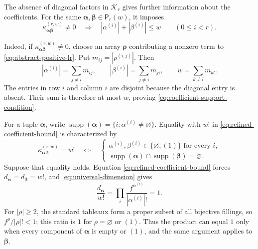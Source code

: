 \documentclass[12pt,reqno,a4paper]{amsart}
\numberwithin{equation}{section}
\numberwithin{figure}{section}
\theoremstyle{plain}
\theoremstyle{definition}
\begin{document}
The absence of diagonal factors in $\mathcal K_r$ gives further
information about the coefficients.  For the same
$\boldsymbol\alpha,\boldsymbol\beta\in\mathsf P_r(w)$, it imposes
\begin{equation}\label{eq:coefficient-support-condition}
 \kappa^{(r,w)}_{\boldsymbol\alpha\boldsymbol\beta}\neq0
 \quad\Longrightarrow\quad
 |\alpha^{(i)}|+|\beta^{(i)}|\leq w
 \qquad(0\leq i<r).
\end{equation}

Indeed, if $\kappa^{(r,w)}_{\boldsymbol\alpha\boldsymbol\beta}\neq0$,
choose an array $\boldsymbol\rho$ contributing a nonzero term to
\eqref{eq:abstract-positive-lr}.  Put
$m_{ij}=|\rho^{(i,j)}|$.  Then
\[
 |\alpha^{(i)}|=\sum_{j\neq i}m_{ij},
 \qquad
 |\beta^{(i)}|=\sum_{j\neq i}m_{ji},
 \qquad
 w=\sum_{k\neq l}m_{kl}.
\]
The entries in row $i$ and column $i$ are disjoint because the
diagonal entry is absent.  Their sum is therefore at most $w$, proving
\eqref{eq:coefficient-support-condition}.

For a tuple $\boldsymbol\alpha$, write
$\operatorname{supp}(\boldsymbol\alpha)=\{i:\alpha^{(i)}\ne\varnothing\}$.
Equality with $w!$ in \eqref{eq:refined-coefficient-bound} is
characterized by
\begin{equation}\label{eq:factorial-equality-case}
 \kappa^{(r,w)}_{\boldsymbol\alpha\boldsymbol\beta}=w!
 \quad\Longleftrightarrow\quad
 \left\{
 \begin{array}{l}
  \alpha^{(i)},\beta^{(i)}\in\{\varnothing,(1)\}
  \text{ for every }i,\\
  \operatorname{supp}(\boldsymbol\alpha)\cap
  \operatorname{supp}(\boldsymbol\beta)=\varnothing.
 \end{array}
 \right.
\end{equation}
Suppose that equality holds.  Equation
\eqref{eq:refined-coefficient-bound} forces
$d_{\boldsymbol\alpha}=d_{\boldsymbol\beta}=w!$, and
\eqref{eq:universal-dimension} gives
\[
 \frac{d_{\boldsymbol\alpha}}{w!}
 =\prod_i\frac{f^{\alpha^{(i)}}}{|\alpha^{(i)}|!}=1.
\]
For $|\rho|\geq2$, the standard tableaux form a proper subset of
all bijective fillings, so $f^\rho/|\rho|!<1$; this ratio is $1$
for $\rho=\varnothing$ or $(1)$.  Thus the product can equal $1$
only when every component of $\boldsymbol\alpha$ is empty or $(1)$,
and the same argument applies to $\boldsymbol\beta$.
\end{document}
